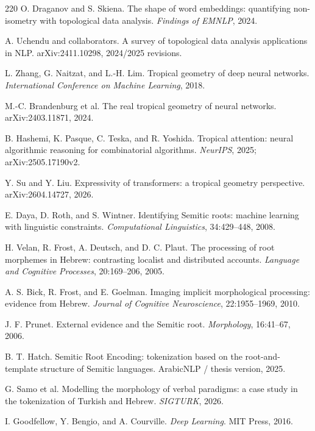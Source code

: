 \documentclass[11pt]{article}
\newcommand{\1}{\mathbf{1}}
\begin{document}
\begin{thebibliography}{220}
O. Draganov and S. Skiena. The shape of word embeddings: quantifying non-isometry with topological data analysis. \emph{Findings of EMNLP}, 2024.

A. Uchendu and collaborators. A survey of topological data analysis applications in NLP. arXiv:2411.10298, 2024/2025 revisions.

L. Zhang, G. Naitzat, and L.-H. Lim. Tropical geometry of deep neural networks. \emph{International Conference on Machine Learning}, 2018.

M.-C. Brandenburg et al. The real tropical geometry of neural networks. arXiv:2403.11871, 2024.

B. Hashemi, K. Pasque, C. Teska, and R. Yoshida. Tropical attention: neural algorithmic reasoning for combinatorial algorithms. \emph{NeurIPS}, 2025; arXiv:2505.17190v2.

Y. Su and Y. Liu. Expressivity of transformers: a tropical geometry perspective. arXiv:2604.14727, 2026.

E. Daya, D. Roth, and S. Wintner. Identifying Semitic roots: machine learning with linguistic constraints. \emph{Computational Linguistics}, 34:429--448, 2008.

H. Velan, R. Frost, A. Deutsch, and D. C. Plaut. The processing of root morphemes in Hebrew: contrasting localist and distributed accounts. \emph{Language and Cognitive Processes}, 20:169--206, 2005.

A. S. Bick, R. Frost, and E. Goelman. Imaging implicit morphological processing: evidence from Hebrew. \emph{Journal of Cognitive Neuroscience}, 22:1955--1969, 2010.

J. F. Prunet. External evidence and the Semitic root. \emph{Morphology}, 16:41--67, 2006.

B. T. Hatch. Semitic Root Encoding: tokenization based on the root-and-template structure of Semitic languages. ArabicNLP / thesis version, 2025.

G. Samo et al. Modelling the morphology of verbal paradigms: a case study in the tokenization of Turkish and Hebrew. \emph{SIGTURK}, 2026.

I. Goodfellow, Y. Bengio, and A. Courville. \emph{Deep Learning}. MIT Press, 2016.


\end{thebibliography}
\end{document}

